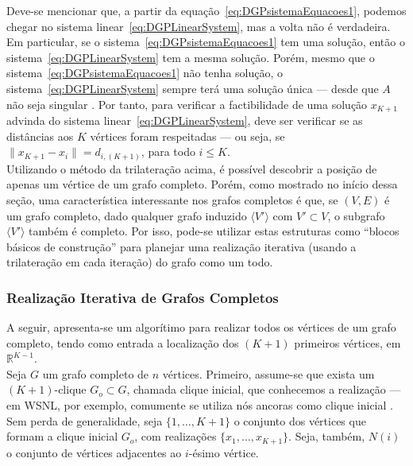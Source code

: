 Deve-se mencionar que, a partir da equação~\ref{eq:DGPsistemaEquacoes1}, podemos chegar no sistema linear~\ref{eq:DGPLinearSystem}, mas a volta não é verdadeira. Em particular, se o sistema~\ref{eq:DGPsistemaEquacoes1} tem uma solução, então o sistema~\ref{eq:DGPLinearSystem} tem a mesma solução. Porém, mesmo que o sistema~\ref{eq:DGPsistemaEquacoes1} não tenha solução, o sistema~\ref{eq:DGPLinearSystem} sempre terá uma solução única --- desde que $A$ não seja singular \cite{libertiEDG}. Por tanto, para verificar a factibilidade de uma solução $x_{K+1}$ advinda do sistema linear~\ref{eq:DGPLinearSystem}, deve ser verificar se as distâncias aos $K$ vértices foram respeitadas --- ou seja, se $\lVert x_{K+1} - x_i\rVert = d_{i,(K+1)}$, para todo $i\leq K$. 
\\

Utilizando o método da trilateração acima, é possível descobrir a posição de apenas um vértice de um grafo completo. Porém, como mostrado no início dessa seção, uma característica interessante nos grafos completos é que, se $(V,E)$ é um grafo completo, dado qualquer grafo induzido $\langle V'\rangle$ com $V'\subset V$, o subgrafo $\langle V' \rangle$ também é completo. Por isso, pode-se utilizar estas estruturas como ``blocos básicos de construção'' para planejar uma realização iterativa (usando a trilateração em cada iteração) do grafo como um todo. 


\subsubsection{Realização Iterativa de Grafos Completos}

A seguir, apresenta-se um algorítimo para realizar todos os vértices de um grafo completo, tendo como entrada a localização dos $(K+1)$ primeiros vértices, em $\mathbb{R}^{K-1}$.
\\

Seja $G$ um grafo completo de $n$ vértices. Primeiro, assume-se que exista um $(K+1)$-clique $G_o \subset G$, chamada clique inicial, que conhecemos a realização --- em WSNL, por exemplo, comumente se utiliza nós ancoras como clique inicial \cite{eren2004rigidity, savvides2001dynamic}. Sem perda de generalidade, seja $\{1,\dots,K+1\}$ o conjunto dos vértices que formam a clique inicial $G_o$, com realizações $\{x_1, \dots,x_{K+1}\}$. Seja, também, $N(i)$ o conjunto de vértices adjacentes ao $i$-ésimo vértice. 
\\

